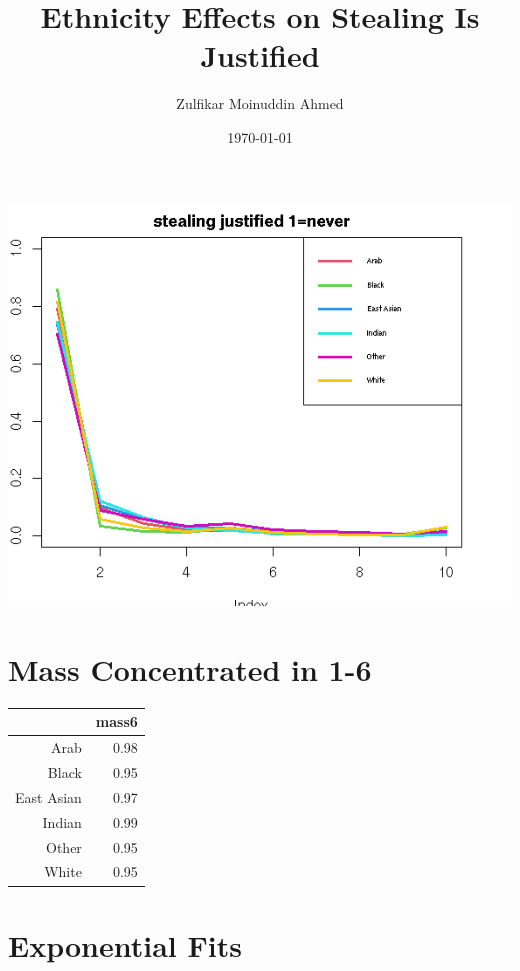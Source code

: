 \documentclass{amsart}
\title{Ethnicity Effects on Stealing Is Justified}
\author{Zulfikar Moinuddin Ahmed}
\date{\today}
\begin{document}
\maketitle

\includegraphics[scale=0.8]{steal.png}

\section{Mass Concentrated in 1-6}

\begin{table}[ht]
\centering
\begin{tabular}{rr}
  \hline
 & mass6 \\ 
  \hline
Arab & 0.98 \\ 
  Black & 0.95 \\ 
  East Asian & 0.97 \\ 
  Indian & 0.99 \\ 
  Other & 0.95 \\ 
  White & 0.95 \\ 
   \hline
\end{tabular}
\end{table}

\section{Exponential Fits}
\end{document}
